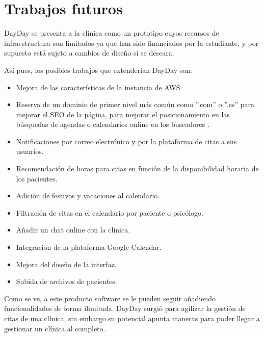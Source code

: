 \section{Trabajos futuros}
 DayDay se presenta a la clínica como un prototipo cuyos recursos de infraestructura son limitados ya que han sido financiados por la estudiante, y por supuesto está sujeto a cambios de diseño si se deseara. \bigskip

 Así pues, los posibles trabajos que extenderían DayDay son:

 \begin{itemize}
     \item Mejora de las características de la instancia de AWS
     \item Reserva de un dominio de primer nivel más común como ''.com'' o ''.es'' para mejorar el SEO de la página, para mejorar el posicionamiento en las búsquedas de agendas o calendarios online en los buscadores \cite{kaushal2019seo} . 
     \item Notificaciones por correo electrónico y por la plataforma de citas a sus usuarios.
     \item Recomendación de horas para citas en función de la disponibilidad horaria de los pacientes.
     \item Adición de festivos y vacaciones al calendario.
     \item Filtración de citas en el calendario por paciente o psicólogo.
     \item Añadir un chat online con la clínica.
     \item Integracion de la plataforma Google Calendar.
     \item Mejora del diseño de la interfaz.
     \item Subida de archivos de pacientes.
 \end{itemize}

Como se ve, a este producto software se le pueden seguir añadiendo funcionalidades de forma ilimitada. DayDay surgió para agilizar la gestión de citas de una clínica, sin embargo su potencial apunta maneras para poder llegar a gestionar un clínica al completo.
 
